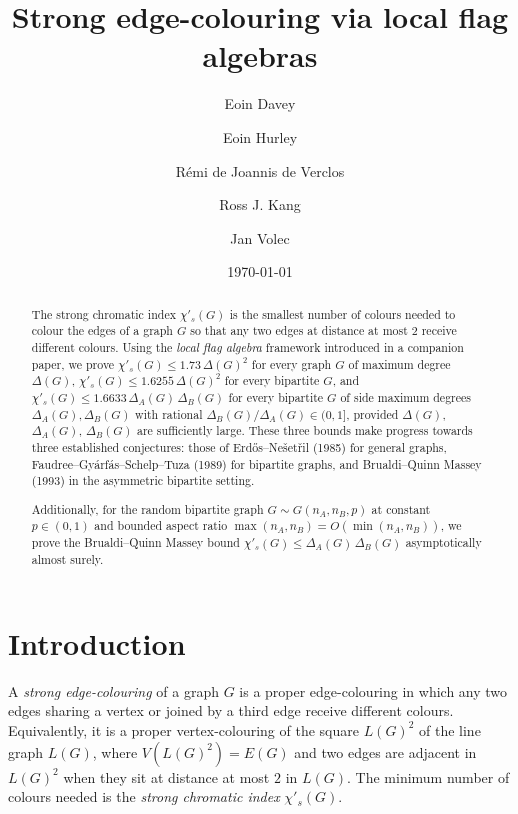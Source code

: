 \documentclass[11pt,a4paper]{article}
\title{Strong edge-colouring via local flag algebras}
\author{Eoin Davey \and Eoin Hurley \and R\'emi de Joannis de Verclos \and Ross J. Kang \and Jan Volec}
\date{\today}
\theoremstyle{definition}
\theoremstyle{remark}
\begin{document}
\maketitle

\begin{abstract}
The strong chromatic index $\chi'_s(G)$ is the smallest number of
colours needed to colour the edges of a graph $G$ so that any two
edges at distance at most $2$ receive different colours. Using the
\emph{local flag algebra} framework introduced in a companion paper, we prove
$\chi'_s(G) \leq 1.73\,\Delta(G)^2$ for every graph $G$ of maximum
degree $\Delta(G)$, $\chi'_s(G) \leq 1.6255\,\Delta(G)^2$ for every
bipartite $G$, and $\chi'_s(G) \leq 1.6633\,\Delta_A(G)\,\Delta_B(G)$
for every bipartite $G$ of side maximum degrees
$\Delta_A(G), \Delta_B(G)$ with rational
$\Delta_B(G)/\Delta_A(G) \in (0, 1]$, provided $\Delta(G)$, $\Delta_A(G)$, $\Delta_B(G)$ are sufficiently large. These three bounds make progress towards three established
conjectures: those of Erd\H{o}s--Ne\v{s}et\v{r}il (1985) for general
graphs, Faudree--Gy\'arf\'as--Schelp--Tuza (1989) for bipartite graphs,
and Brualdi--Quinn Massey (1993) in the asymmetric bipartite setting.

Additionally, for the random bipartite graph $G \sim G(n_A, n_B, p)$
at constant $p \in (0,1)$ and bounded aspect ratio
$\max(n_A, n_B) = O(\min(n_A, n_B))$, we prove the
Brualdi--Quinn Massey bound
$\chi'_s(G) \leq \Delta_A(G)\,\Delta_B(G)$ asymptotically almost
surely.
\end{abstract}


\section{Introduction}
\label{sec:introduction}

A \emph{strong edge-colouring} of a graph $G$ is a proper edge-colouring in which any two edges sharing a vertex or joined by a
third edge receive different colours. Equivalently, it is a proper
vertex-colouring of the square $L(G)^2$ of the line graph $L(G)$, where
$V(L(G)^2) = E(G)$ and two edges are adjacent in $L(G)^2$ when they
sit at distance at most $2$ in $L(G)$. The minimum number of colours
needed is the \emph{strong chromatic index} $\chi'_s(G)$.
\end{document}
